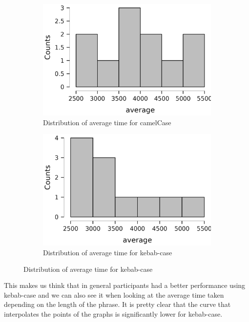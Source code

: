 \documentclass{article}
\begin{document}
\begin{figure}[h!]
    \centering
		\begin{subfigure}{0.49\textwidth}
			\includegraphics[width=\textwidth]{images/avg_camel.png}
			\caption{Distribution of average time for camelCase}
		\end{subfigure}
		\begin{subfigure}{0.49\textwidth}
			\includegraphics[width=\textwidth]{images/avg_kebab.png}
			\caption{Distribution of average time for kebab-case}
		\end{subfigure}
\end{figure}

This makes us think that in general participants had a better performance using kebab-case and we can also see it when 
looking at the average time taken depending on the length of the phrase. It is pretty clear that the curve that interpolates the points of the graphs 
is significantly lower for kebab-case.
\end{document}
